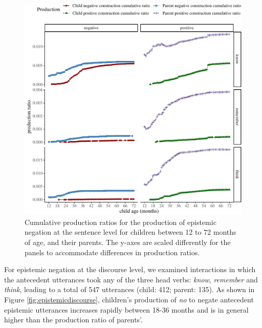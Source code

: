 \documentclass[
  man,floatsintext]{apa6}
\begin{document}
\begin{figure}[H]

{\centering \includegraphics{neg_construction_article_files/figure-latex/epistemic-1} 

}

\caption{Cumulative production ratios for the production of epistemic negation at the sentence level for children between 12 to 72 months of age, and their parents. The y-axes are scaled differently for the panels to accommodate differences in production ratios.}\label{fig:epistemic}
\end{figure}

For epistemic negation at the discourse level, we examined interactions in which the antecedent utterances took any of the three head verbs: \emph{know}, \emph{remember} and \emph{think}, leading to a total of 547 utterances (child: 412; parent: 135). As shown in Figure \ref{fig:epistemicdiscourse}, children's production of \emph{no} to negate antecedent epistemic utterances increases rapidly between 18-36 months and is in general higher than the production ratio of parents'.
\end{document}
